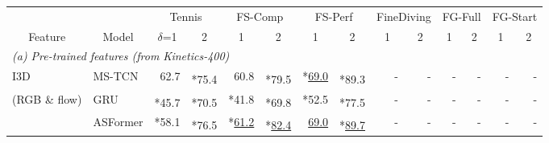 \documentclass[runningheads]{llncs}
\newcommand{\OURMETHOD}{{E2E-Spot}\xspace}
\newcommand{\fscomp}{{FS-Comp}\xspace}
\newcommand{\fsperf}{{FS-Perf}\xspace}
\newcommand{\tennis}{{Tennis}\xspace}
\newcommand{\finediving}{{FineDiving}\xspace}
\newcommand{\best}[1]{\underline{#1}}
\newcommand{\sota}[1]{\textbf{#1}}
\newcommand{\nms}{\textsuperscript{\textdagger}}
\newcommand{\loss}{*}
\begin{document}
\renewcommand{\tabcolsep}{0.05cm}
\begin{table*}[t]
    \caption{{\bf Spotting performance (mAP @ $\delta$ frames).}
The top results in each category and each column are \best{underlined}.
SOTA is \sota{bold}.
We report best results under the following: \textdagger~indicates NMS; * indicates CALF~\cite{calf} or dilation.
(e) \OURMETHOD, trained with RGB only, generally outperforms the non-pose baselines and is competitive with the pose baselines on Figure Skating.
\OURMETHOD can further be improved with a larger 800MF CNN and a 2-stream ensemble with flow.
    }
    \label{tab:frame_accurate_results}
    {
    \tiny
    \centering
    \begin{tabularx}{\textwidth}{ll
        rr
        rr
        rr
        rr
        rr
        rr
    }
        \toprule
        &
            & \multicolumn{2}{c}{\tennis}
            & \multicolumn{2}{c}{\fscomp}
            & \multicolumn{2}{c}{\fsperf}
            & \multicolumn{2}{c}{\finediving}
            & \multicolumn{2}{c}{FG-Full}
            & \multicolumn{2}{c}{FG-Start}
            \\
        \multicolumn{1}{c}{Feature} & \multicolumn{1}{c}{Model}
            & \multicolumn{1}{c}{$\delta$=1}
            & \multicolumn{1}{c}{2}
            & \multicolumn{1}{c}{1}
            & \multicolumn{1}{c}{2}
            & \multicolumn{1}{c}{1}
            & \multicolumn{1}{c}{2}
            & \multicolumn{1}{c}{1}
            & \multicolumn{1}{c}{2}
            & \multicolumn{1}{c}{1}
            & \multicolumn{1}{c}{2}
            & \multicolumn{1}{c}{1}
            & \multicolumn{1}{c}{2}
            \\
        \midrule
        \multicolumn{12}{l}{\em(a) Pre-trained features (from Kinetics-400)} \\
I3D~\cite{i3d}
        & MS-TCN
            & 62.7 & \nms \loss75.4
            & 60.8 & \nms \loss79.5
            & \loss \best{69.0} & \nms\loss 89.3
            & - & -
            & - & -
            & - & -
            \\

        (RGB \& flow)
        & GRU
            & \nms \loss 45.7 & \nms \loss 70.5
            & \loss 41.8 & \nms \loss69.8
            & \loss 52.5 & \nms \loss77.5
            & - & -
            & - & -
            & - & -
            \\

        & ASFormer
            & \loss 58.1 & \nms\loss 76.5
            & \loss \best{61.2} & \nms\loss \best{82.4}
            & \best{69.0} & \nms\loss \best{89.7}
            & - & -
            & - & -
            & - & -
            \\


\end{tabularx}}
\end{table*}
\end{document}
